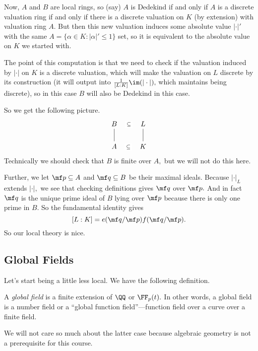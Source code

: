Now, $A$ and $B$ are local rings, so (say) $A$ is Dedekind if and only if $A$ is a discrete valuation ring if and only if there is a discrete valuation on $K$ (by extension) with valuation ring $A.$ But then this new valuation induces some absolute value $|\cdot|'$ with the same $A=\{\alpha\in K:|\alpha|'\le1\}$ set, so it is equivalent to the absolute value on $K$ we started with.

The point of this computation is that we need to check if the valuation induced by $|\cdot|$ on $K$ is a discrete valuation, which will make the valuation on $L$ discrete by its construction (it will output into $\frac1{[L:K]}\im(|\cdot|),$ which maintains being discrete), so in this case $B$ will also be Dedekind in this case.

So we get the following picture.
\[\begin{tikzcd}
	B & L \\
	A & K
	\arrow[no head, from=1-2, to=2-2]
	\arrow[no head, from=1-1, to=2-1]
	\arrow["\subseteq"{description}, draw=none, from=1-1, to=1-2]
	\arrow["\subseteq"{description}, draw=none, from=2-1, to=2-2]
\end{tikzcd}\]
Technically we should check that $B$ is finite over $A,$ but we will not do this here.

Further, we let $\mf p\subseteq A$ and $\mf q\subseteq B$ be their maximal ideals. Because $|\cdot|_L$ extends $|\cdot|,$ we see that checking definitions gives $\mf q$ over $\mf p.$ And in fact $\mf q$ is the unique prime ideal of $B$ lying over $\mf p$ because there is only one prime in $B.$ So the fundamental identity gives
\[[L:K]=e(\mf q/\mf p)f(\mf q/\mf p).\]
So our local theory is nice.

\subsection{Global Fields}
Let's start being a little less local. We have the following definition.
\begin{definition}
	A \textit{global field} is a finite extension of $\QQ$ or $\FF_p(t).$ In other words, a global field is a number field or a ``global function field''---function field over a curve over a finite field.
\end{definition}
We will not care so much about the latter case because algebraic geometry is not a prerequisite for this course.